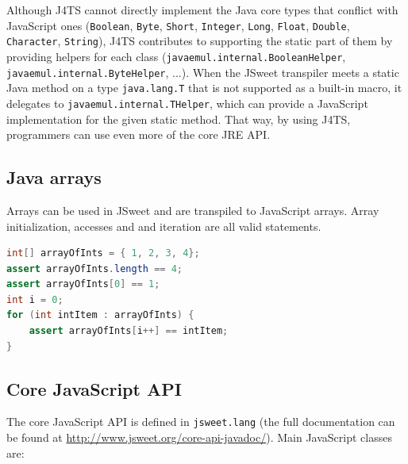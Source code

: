 \documentclass[a4paper]{report}
\begin{document}
Although J4TS cannot directly implement the Java core types that conflict with JavaScript ones (\texttt{Boolean}, \texttt{Byte}, \texttt{Short}, \texttt{Integer}, \texttt{Long}, \texttt{Float}, \texttt{Double}, \texttt{Character}, \texttt{String}), J4TS contributes to supporting the static part of them by providing helpers for each class (\texttt{javaemul.internal.BooleanHelper}, \texttt{javaemul.internal.ByteHelper}, ...). When the JSweet transpiler meets a static Java method on a type \texttt{java.lang.T} that is not supported as a built-in macro, it delegates to \texttt{javaemul.internal.THelper}, which can provide a JavaScript implementation for the given static method. That way, by using J4TS, programmers can use even more of the core JRE API.

\subsection{Java arrays}

Arrays can be used in JSweet and are transpiled to JavaScript arrays. Array initialization, accesses and and iteration are all valid statements.

\begin{lstlisting}[language=Java]
int[] arrayOfInts = { 1, 2, 3, 4};
assert arrayOfInts.length == 4;  
assert arrayOfInts[0] == 1;
int i = 0;
for (int intItem : arrayOfInts) { 
	assert arrayOfInts[i++] == intItem;
}
\end{lstlisting}

\subsection{Core JavaScript API}

The core JavaScript API is defined in \texttt{jsweet.lang} (the full documentation can be found at \url{http://www.jsweet.org/core-api-javadoc/}). Main JavaScript classes are:
\end{document}
